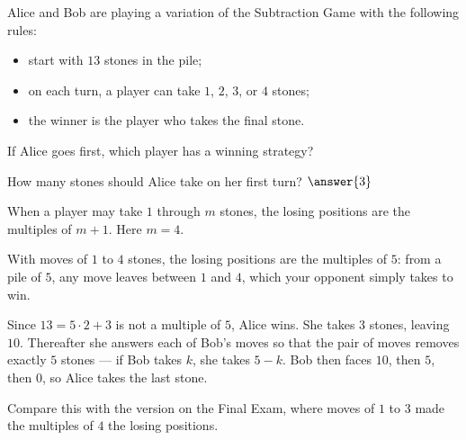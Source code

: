 \documentclass[12pt]{ximera}
\begin{document}
\begin{problem}
Alice and Bob are playing a variation of the Subtraction Game with the following
rules:
\begin{itemize}
\item start with $13$ stones in the pile;
\item on each turn, a player can take $1$, $2$, $3$, or $4$ stones;
\item the winner is the player who takes the final stone.
\end{itemize}

\begin{prompt}
If Alice goes first, which player has a winning strategy?

\begin{multipleChoice}
\end{multipleChoice}

How many stones should Alice take on her first turn? $\answer{3}$

\begin{hint}
When a player may take $1$ through $m$ stones, the losing positions are the multiples
of $m+1$. Here $m=4$.
\end{hint}

\begin{feedback}
With moves of $1$ to $4$ stones, the losing positions are the multiples of $5$: from a
pile of $5$, any move leaves between $1$ and $4$, which your opponent simply takes to
win.

Since $13 = 5\cdot 2 + 3$ is not a multiple of $5$, Alice wins. She takes $3$ stones,
leaving $10$. Thereafter she answers each of Bob's moves so that the pair of moves
removes exactly $5$ stones --- if Bob takes $k$, she takes $5-k$. Bob then faces
$10$, then $5$, then $0$, so Alice takes the last stone.

Compare this with the version on the Final Exam, where moves of $1$ to $3$ made the
multiples of $4$ the losing positions.
\end{feedback}
\end{prompt}
\end{problem}
\end{document}
